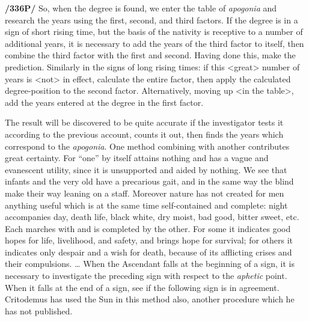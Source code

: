 \textbf{/336P/} So, when the degree is found, we enter the table of \textit{apogonia} and research the years using the first, second, and third factors. If the degree is in a sign of short rising time, but the basis of the nativity is receptive to a number of additional years, it is necessary to add the years of the third factor to itself, then combine the third factor with the first and second. Having done this, make the prediction. Similarly in the signs of long rising times: if this <great> number of years is <not> in effect, calculate the entire factor, then apply the calculated degree-position to the second factor. Alternatively, moving up <in the table>, add the years entered at the degree in the first factor.

The result will be discovered to be quite accurate if the investigator tests it according to the previous account, counts it out, then finds the years which correspond to the \textit{apogonia}. One method combining with another contributes great certainty. For “one” by itself attains nothing and has a vague and evanescent utility, since it is unsupported and aided by nothing. We see that infants and the very old have a precarious gait, and in the same way the blind make their way leaning on a staff. Moreover nature has not created for men anything useful which is at the same time self-contained and complete: night accompanies day, death life, black white, dry moist, bad good, bitter sweet, etc. Each marches with and is completed by the other. For some it indicates good hopes for life, livelihood, and safety, and brings hope for survival; for others it indicates only despair and a wish for death, because of its afflicting crises and their compulsions.
…
When the Ascendant falls at the beginning of a sign, it is necessary to investigate the preceding sign with respect to the \textit{aphetic} point. When it falls at the end of a sign, see if the following sign is in agreement. Critodemus has used the Sun in this method also, another procedure which he has not published.


\newpage